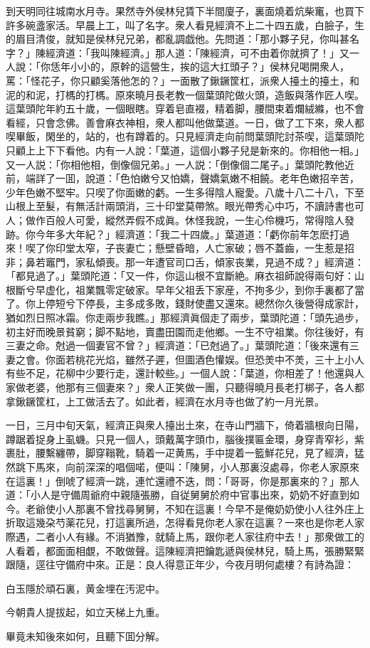 到天明同往城南水月寺。果然寺外侯林兒賃下半間廈子，裏面燒着炕柴竃，也買下許多碗盞家活。早晨上工，叫了名字。衆人看見經濟不上二十四五歲，白臉子，生的眉目清俊，就知是侯林兒兄弟，都亂調戯他。先問道：「那小夥子兒，你叫甚名字？」陳經濟道：「我叫陳經濟。」那人道：「陳經濟，可不由着你就擠了！」又一人說：「你恁年小小的，原幹的這營生，挨的這大扛頭子？」侯林兒喝開衆人，罵：「怪花子，你只顧奚落他怎的？」一面散了鍬鐝筐杠，派衆人擡土的擡土，和泥的和泥，打榪的打榪。原來曉月長老教一個葉頭陀做火頭，造飯與落作匠人喫。這葉頭陀年約五十歲，一個眼瞎。穿着皂直裰，精着脚，腰間束着爛絨縧，也不會看經，只會念佛。善會麻衣神相，衆人都叫他做葉道。一日，做了工下來，衆人都喫畢飯，閑坐的，站的，也有蹲着的。只見經濟走向前問葉頭陀討茶喫，這葉頭陀只顧上上下下看他。内有一人說：「葉道，這個小夥子兒是新來的。你相他一相。」又一人説：「你相他相，倒像個兄弟。」一人説：「倒像個二尾子。」葉頭陀教他近前，端詳了一囬，說道：「色怕嫩兮又怕嬌，聲嬌氣嫩不相饒。老年色嫩招辛苦，少年色嫩不堅牢。只喫了你面嫩的虧。一生多得陰人寵愛。八歲十八二十八，下至山根上至髮，有無活計兩頭消，三十印堂莫帶煞。眼光帶秀心中巧，不讀詩書也可人；做作百般人可愛，縱然弄假不成眞。休怪我說，一生心伶機巧，常得陰人發跡。你今年多大年紀？」經濟道：「我二十四歲。」葉道道：「虧你前年怎麽打過來！喫了你印堂太窄，子丧妻亡；懸壁昏暗，人亡家破；唇不蓋齒，一生惹是招非；鼻若竈門，家私傾喪。那一年遭官司口舌，傾家丧業，見過不成？」經濟道：「都見過了。」葉頭陀道：「又一件，你這山根不宜斷絶。麻衣祖師說得兩句好：山根斷兮早虚化，祖業飄零定破家。早年父祖丢下家産，不拘多少，到你手裏都了當了。你上停短兮下停長，主多成多敗，錢財使盡又還來。總然你久後營得成家計，猶如烈日照冰霜。你走兩步我瞧。」那經濟眞個走了兩步，葉頭陀道：「頭先過步，初主好而晚景貧窮；脚不點地，賣盡田園而走他鄉。一生不守祖業。你往後好，有三妻之命。尅過一個妻官不曾？」經濟道：「已尅過了。」葉頭陀道：「後來還有三妻之會。你面若桃花光焰，雖然子遲，但圖酒色懽娱。但恐羙中不羙，三十上小人有些不足，花柳中少要行走，還計較些。」一個人說：「葉道，你相差了！他還與人家做老婆，他那有三個妻來？」衆人正笑做一團，只聽得曉月長老打梆子，各人都拿鍬鐝筐杠，上工做活去了。如此者，經濟在水月寺也做了約一月光景。

一日，三月中旬天氣，經濟正與衆人擡出土來，在寺山門牆下，倚着牆根向日陽，蹲踞着捉身上虱蟣。只見一個人，頭戴萬字頭巾，腦後撲匾金環，身穿青窄衫，紫裹肚，腰繫纏帶，脚穿䩺靴，騎着一疋黄馬，手中提着一籃鮮花兒，見了經濟，猛然跳下馬來，向前深深的唱個喏，便叫：「陳舅，小人那裏沒處尋，你老人家原來在這裏！」倒唬了經濟一跳，連忙還禮不迭，問：「哥哥，你是那裏來的？」那人道：「小人是守備周爺府中親隨張勝，自従舅舅於府中官事出來，奶奶不好直到如今。老爺使小人那裏不曾找尋舅舅，不知在這裏！今早不是俺奶奶使小人往外庄上折取這幾朶芍薬花兒，打這裏所過，怎得看見你老人家在這裏？一來也是你老人家際遇，二者小人有緣。不消猶豫，就騎上馬，跟你老人家往府中去！」那衆做工的人看着，都面面相覷，不敢做聲。這陳經濟把鑰匙遞與侯林兒，騎上馬，張勝緊緊跟隨，逕往守備府中來。正是：良人得意正年少，今夜月明何處樓？有詩為證：

\begin{myquote}
白玉隱於頑石裏，黄金埋在汚泥中。

今朝貴人提拔起，如立天梯上九重。
\end{myquote}

畢竟未知後來如何，且聽下囬分解。

